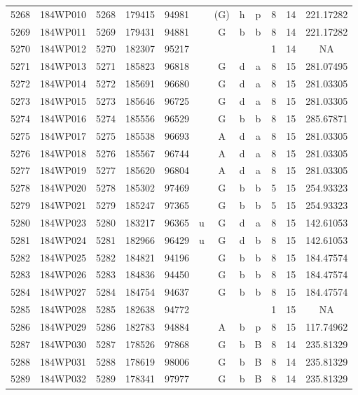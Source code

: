\begin{tabular}{|*{12}{c|}}
5268 & 184WP010 & 5268 & 179415 & 94981 &  & (G) & h & p & 8 & 14 & 221.17282 \\ 
5269 & 184WP011 & 5269 & 179431 & 94881 &  & G & b & b & 8 & 14 & 221.17282 \\ 
5270 & 184WP012 & 5270 & 182307 & 95217 &  &  &  &  & 1 & 14 & NA \\ 
5271 & 184WP013 & 5271 & 185823 & 96818 &  & G & d & a & 8 & 15 & 281.07495 \\ 
5272 & 184WP014 & 5272 & 185691 & 96680 &  & G & d & a & 8 & 15 & 281.03305 \\ 
5273 & 184WP015 & 5273 & 185646 & 96725 &  & G & d & a & 8 & 15 & 281.03305 \\ 
5274 & 184WP016 & 5274 & 185556 & 96529 &  & G & b & b & 8 & 15 & 285.67871 \\ 
5275 & 184WP017 & 5275 & 185538 & 96693 &  & A & d & a & 8 & 15 & 281.03305 \\ 
5276 & 184WP018 & 5276 & 185567 & 96744 &  & A & d & a & 8 & 15 & 281.03305 \\ 
5277 & 184WP019 & 5277 & 185620 & 96804 &  & A & d & a & 8 & 15 & 281.03305 \\ 
5278 & 184WP020 & 5278 & 185302 & 97469 &  & G & b & b & 5 & 15 & 254.93323 \\ 
5279 & 184WP021 & 5279 & 185247 & 97365 &  & G & b & b & 5 & 15 & 254.93323 \\ 
5280 & 184WP023 & 5280 & 183217 & 96365 & u & G & d & a & 8 & 15 & 142.61053 \\ 
5281 & 184WP024 & 5281 & 182966 & 96429 & u & G & d & b & 8 & 15 & 142.61053 \\ 
5282 & 184WP025 & 5282 & 184821 & 94196 &  & G & b & b & 8 & 15 & 184.47574 \\ 
5283 & 184WP026 & 5283 & 184836 & 94450 &  & G & b & b & 8 & 15 & 184.47574 \\ 
5284 & 184WP027 & 5284 & 184754 & 94637 &  & G & b & b & 8 & 15 & 184.47574 \\ 
5285 & 184WP028 & 5285 & 182638 & 94772 &  &  &  &  & 1 & 15 & NA \\ 
5286 & 184WP029 & 5286 & 182783 & 94884 &  & A & b & p & 8 & 15 & 117.74962 \\ 
5287 & 184WP030 & 5287 & 178526 & 97868 &  & G & b & B & 8 & 14 & 235.81329 \\ 
5288 & 184WP031 & 5288 & 178619 & 98006 &  & G & b & B & 8 & 14 & 235.81329 \\ 
5289 & 184WP032 & 5289 & 178341 & 97977 &  & G & b & B & 8 & 14 & 235.81329 \\ 

\end{tabular}
